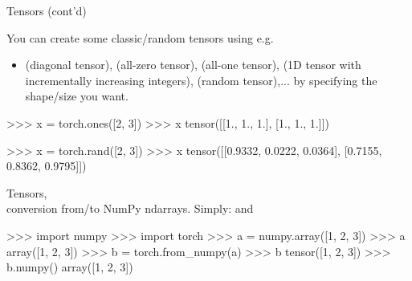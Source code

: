 \begin{frame}[fragile]{Tensors (cont'd)}
\vspace{-7mm}

You can create some classic/random tensors using e.g.
\begin{itemize}
\item  {} (diagonal tensor),  (all-zero tensor),  (all-one tensor),  (1D tensor with incrementally increasing integers),
 (random tensor),... by specifying the shape/size you want.
\end{itemize}
\begin{python}
>>> x = torch.ones([2, 3])
>>> x
tensor([[1., 1., 1.],
        [1., 1., 1.]])
\end{python}
\begin{python}
>>> x = torch.rand([2, 3])
>>> x
tensor([[0.9332, 0.0222, 0.0364],
        [0.7155, 0.8362, 0.9795]])
\end{python}
\end{frame}

\begin{frame}[fragile]{Tensors, \\conversion from/to NumPy ndarrays.}
Simply:  and 
\begin{python}
>>> import numpy
>>> import torch
>>> a = numpy.array([1, 2, 3])
>>> a
array([1, 2, 3])
>>> b = torch.from_numpy(a)
>>> b
tensor([1, 2, 3])
>>> b.numpy()
array([1, 2, 3])
\end{python}

\end{frame}

